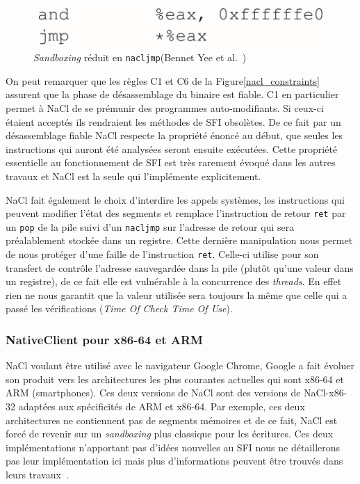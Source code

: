 \documentclass[11pt]{sdm}
\begin{document}
\begin{figure}[b]
\centering
\includegraphics[scale=0.22]{images/nacl_jump.png}
\caption{\textit{Sandboxing} réduit en \texttt{nacljmp}(Bennet Yee et al.~\cite{Yee:2010:NCS:1629175.1629203})}
\label{nacl_jump}
\end{figure}


On peut remarquer que les règles C1 et C6 de la Figure\ref{nacl_constraints} assurent que la phase de désassemblage du binaire est fiable. C1 en particulier permet à NaCl de se prémunir des programmes auto-modifiants. Si ceux-ci étaient acceptés ils rendraient les méthodes de SFI obsolètes.
De ce fait par un désassemblage fiable NaCl respecte la propriété énoncé au début, que seules les instructions qui auront été analysées seront ensuite exécutées. Cette propriété essentielle au fonctionnement de SFI est très rarement évoqué dans les autres travaux et NaCl est la seule qui l'implémente explicitement.

NaCl fait également le choix d'interdire les appels systèmes, les instructions qui peuvent modifier l'état des segments et remplace l'instruction de retour \texttt{ret} par un \texttt{pop} de la pile suivi d'un \texttt{nacljmp} sur l'adresse de retour qui sera préalablement stockée dans un registre. Cette dernière manipulation nous permet de nous protéger d'une faille de l'instruction \texttt{ret}. Celle-ci utilise pour son transfert de contrôle l'adresse sauvegardée dans la pile (plutôt qu'une valeur dans un registre), de ce fait elle est vulnérable à la concurrence des \textit{threads}. En effet rien ne nous garantit que la valeur utilisée sera toujours la même que celle qui a passé les vérifications (\textit{Time Of Check Time Of Use}).


\subsubsection{NativeClient pour x86-64 et ARM}
NaCl voulant être utilisé avec le navigateur Google Chrome, Google a fait évoluer son produit vers les architectures les plus courantes actuelles qui sont x86-64 et ARM (smartphones). Ces deux versions de NaCl sont des versions de NaCl-x86-32 adaptées aux spécificités de ARM et x86-64. Par exemple, ces deux architectures ne contiennent pas de segments mémoires et de ce fait, NaCl est forcé de revenir sur un \textit{sandboxing} plus classique pour les écritures.
Ces deux implémentations n'apportant pas d'idées nouvelles au SFI nous ne détaillerons pas leur implémentation ici mais plus d'informations peuvent être trouvés dans leurs travaux~\cite{Sehr:2010:ASF:1929820.1929822}.
\end{document}
